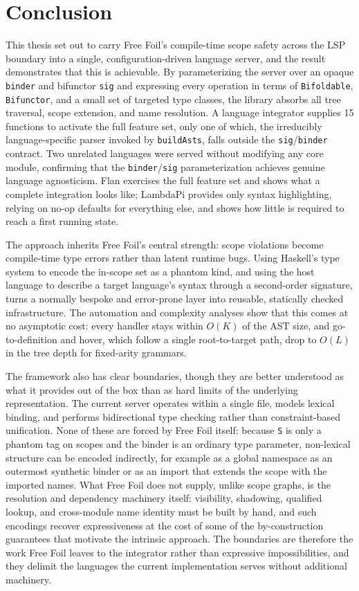 \chapter{Conclusion}
\label{chap:conclusion}

This thesis set out to carry Free Foil's compile-time scope safety across the LSP boundary into a single, configuration-driven language server, and the result demonstrates that this is achievable.
By parameterizing the server over an opaque \texttt{binder} and bifunctor \texttt{sig} and expressing every operation in terms of \texttt{Bifoldable}, \texttt{Bifunctor}, and a small set of targeted type classes, the library absorbs all tree traversal, scope extension, and name resolution.
A language integrator supplies 15 functions to activate the full feature set, only one of which, the irreducibly language-specific parser invoked by \texttt{buildAsts}, falls outside the \texttt{sig}/\texttt{binder} contract.
Two unrelated languages were served without modifying any core module, confirming that the \texttt{binder}/\texttt{sig} parameterization achieves genuine language agnosticism.
Flan exercises the full feature set and shows what a complete integration looks like; LambdaPi provides only syntax highlighting, relying on no-op defaults for everything else, and shows how little is required to reach a first running state.

The approach inherits Free Foil's central strength: scope violations become compile-time type errors rather than latent runtime bugs.
Using Haskell's type system to encode the in-scope set as a phantom kind, and using the host language to describe a target language's syntax through a second-order signature, turns a normally bespoke and error-prone layer into reusable, statically checked infrastructure.
The automation and complexity analyses show that this comes at no asymptotic cost: every handler stays within $O(K)$ of the AST size, and go-to-definition and hover, which follow a single root-to-target path, drop to $O(L)$ in the tree depth for fixed-arity grammars.

The framework also has clear boundaries, though they are better understood as what it provides out of the box than as hard limits of the underlying representation.
The current server operates within a single file, models lexical binding, and performs bidirectional type checking rather than constraint-based unification.
None of these are forced by Free Foil itself: because \texttt{S} is only a phantom tag on scopes and the binder is an ordinary type parameter, non-lexical structure can be encoded indirectly, for example as a global namespace as an outermost synthetic binder or as an import that extends the scope with the imported names.
What Free Foil does not supply, unlike scope graphs, is the resolution and dependency machinery itself: visibility, shadowing, qualified lookup, and cross-module name identity must be built by hand, and such encodings recover expressiveness at the cost of some of the by-construction guarantees that motivate the intrinsic approach.
The boundaries are therefore the work Free Foil leaves to the integrator rather than expressive impossibilities, and they delimit the languages the current implementation serves without additional machinery.

